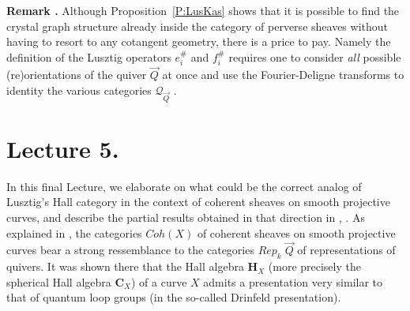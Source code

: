 \documentclass[a4paper,10pt]{amsart}
\def\H{\mathbf{H}}
\numberwithin{equation}{section}
\begin{document}
\vspace{.2in}

\addtocounter{theo}{1}
\noindent \textbf{Remark \thetheo .} Although Proposition~\ref{P:LusKas} shows that it is possible to find the crystal graph structure already inside the category of perverse sheaves without having to resort to any cotangent geometry, there is a price to pay. Namely the definition of the Lusztig operators $e_i^{\#}$ and $f_i^\#$ requires one to consider \textit{all} possible (re)orientations of the quiver $\vec{Q}$ at once and use the Fourier-Deligne transforms to identity the various categories $\mathcal{Q}_{\vec{Q}}$ .

\newpage

\section{Lecture 5.}

\setcounter{section}{5}
\setcounter{theo}{0}
\setcounter{equation}{0}

\vspace{.2in}

In this final Lecture, we elaborate on what could be the correct analog of Lusztig's Hall category in the context of coherent sheaves on smooth projective curves, and describe the partial results obtained in that direction in \cite{SInvent}, \cite{Scano}. As explained in \cite[Lecture~4]{Trieste}, the categories $Coh(X)$ of coherent sheaves on smooth projective curves bear a strong ressemblance to the categories $Rep_{k}\;\vec{Q}$ of representations of quivers. It was shown there that the Hall algebra $\H_X$ (more precisely the spherical Hall algebra $\mathbf{C}_X$) of a curve $X$ admits a presentation very similar to that of quantum loop groups (in the so-called Drinfeld presentation).

\vspace{.1in}
\end{document}
